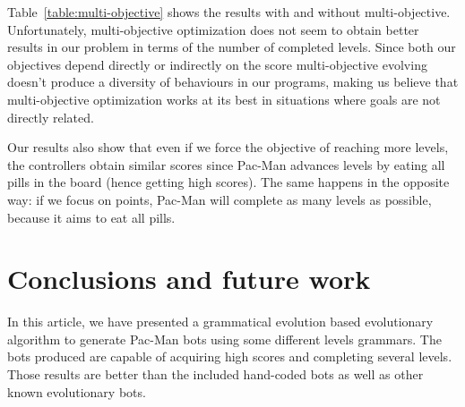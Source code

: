 \documentclass{llncs}
\newcommand{\paco}{Pac-Man }
\begin{document}
Table~\ref{table:multi-objective} shows the results with and without multi-objective. Unfortunately, multi-objective optimization does not seem to obtain better results in our problem in terms of the number of completed levels. Since both our objectives depend directly or indirectly on the score multi-objective evolving doesn't produce a diversity of behaviours in our programs, making us believe that multi-objective optimization works at its best in situations where goals are not directly related. 

Our results also show that even if we force the objective of reaching more levels, the controllers obtain similar scores since \paco advances levels by eating all pills in the board (hence getting high scores). The same happens in the opposite way: if we focus on points, \paco will complete as many levels as possible, because it aims to eat all pills.


%
\section{Conclusions and future work}
\label{sec:conclusions}
%
In this article, we have presented a grammatical evolution based evolutionary algorithm to generate Pac-Man bots using some different levels grammars. The bots produced are capable of acquiring high scores and completing several levels. Those results are better than the included hand-coded bots as well as other known evolutionary bots\cite{galvan2010evolving}.
\end{document}
